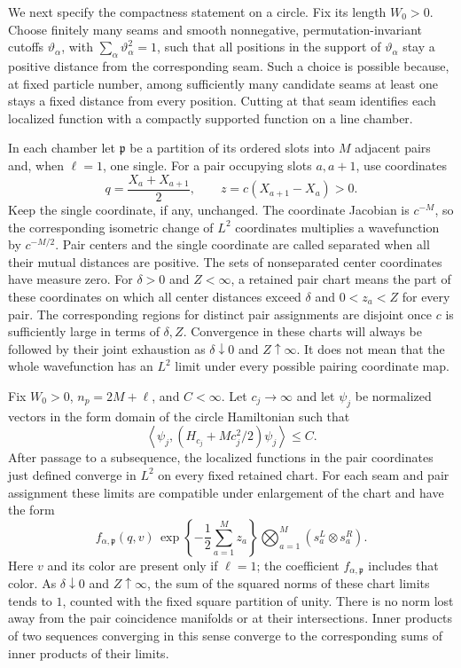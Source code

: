 We next specify the compactness statement on a circle.  Fix its
length \(W_0>0\).  Choose finitely many seams and smooth nonnegative,
permutation-invariant cutoffs \(\vartheta_\alpha\), with
\(\sum_\alpha\vartheta_\alpha^2=1\), such that all positions in the
support of \(\vartheta_\alpha\) stay a positive distance from the
corresponding seam.  Such a choice is possible because, at fixed
particle number, among sufficiently many candidate seams at least
one stays a fixed distance from every position.  Cutting at that
seam identifies each localized function with a compactly supported
function on a line chamber.

In each chamber let \(\mathfrak p\) be a partition of its ordered
slots into \(M\) adjacent pairs and, when \(\ell=1\), one single.
For a pair occupying slots \(a,a+1\), use coordinates
\[
 q=\frac{X_a+X_{a+1}}2,\qquad
 z=c(X_{a+1}-X_a)>0.
\]
Keep the single coordinate, if any, unchanged.
The coordinate Jacobian is \(c^{-M}\), so the corresponding
isometric change of \(L^2\) coordinates multiplies a wavefunction
by \(c^{-M/2}\).  Pair centers and the single coordinate are
called separated when all their mutual distances are positive.
The sets of nonseparated center coordinates have measure zero.
For \(\delta>0\) and \(Z<\infty\), a retained pair chart means the
part of these coordinates on which all center distances exceed
\(\delta\) and \(0<z_a<Z\) for every pair.
The corresponding regions for distinct pair assignments are
disjoint once \(c\) is sufficiently large in terms of \(\delta,Z\).
Convergence in these charts will always be followed by their
joint exhaustion as \(\delta\downarrow0\) and \(Z\uparrow\infty\).
It does not mean that the whole wavefunction has an \(L^2\) limit
under every possible pairing coordinate map.

\begin{lemma}
\label{lem:bethe-pair-compactness}
Fix \(W_0>0\), \(n_p=2M+\ell\), and \(C<\infty\).
Let \(c_j\to\infty\) and let \(\psi_j\) be normalized vectors in
the form domain of the circle Hamiltonian such that
\[
 \left\langle\psi_j,
        (H_{c_j}+Mc_j^2/2)\psi_j\right\rangle\leq C.
\]
After passage to a subsequence, the localized functions in the
pair coordinates just defined converge in \(L^2\) on every fixed
retained chart.  For each seam and pair assignment these limits
are compatible under enlargement of the chart and have the form
\begin{equation}
 f_{\alpha,\mathfrak p}(q,v)\,
 \exp\left\{-\frac12\sum_{a=1}^M z_a\right\}
 \bigotimes_{a=1}^M
        (s_a^L\otimes s_a^R).
\label{eq:B12}
\end{equation}
Here \(v\) and its color are present only if \(\ell=1\); the
coefficient \(f_{\alpha,\mathfrak p}\) includes that color.
As \(\delta\downarrow0\) and \(Z\uparrow\infty\), the sum of the
squared norms of these chart limits tends to \(1\), counted with
the fixed square partition of unity.
There is no norm lost away from the pair coincidence manifolds
or at their intersections.  Inner products of two sequences
converging in this sense converge to the corresponding sums of
inner products of their limits.
\end{lemma}

